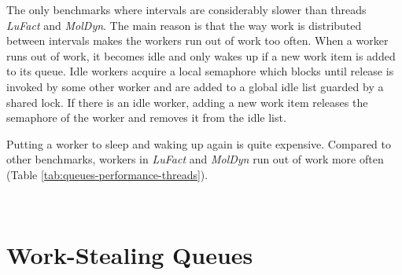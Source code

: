 The only benchmarks where intervals are considerably slower than
threads \emph{LuFact} and \emph{MolDyn}. The main reason is that the
way work is distributed between intervals makes the workers run out of
work too often. When a worker runs out of work, it becomes idle and
only wakes up if a new work item is added to its queue. Idle workers
acquire a local semaphore which blocks until release is invoked by
some other worker and are added to a global idle list guarded by a
shared lock. If there is an idle worker, adding a new work item
releases the semaphore of the worker and removes it from the idle
list.

Putting a worker to sleep and waking up again is quite
expensive. Compared to other benchmarks, workers in \emph{LuFact} and
\emph{MolDyn} run out of work more often (Table
\ref{tab:queues-performance-threads}).

\begin{table}[htb]
  \centering
  \\
  \caption[Idle workers]{Times workers run out of work and become idle, and get woken up again}
  \label{tab:queues-performance-threads}
\end{table}


\section{Work-Stealing Queues}
\label{sec:queues-performance-ws}


